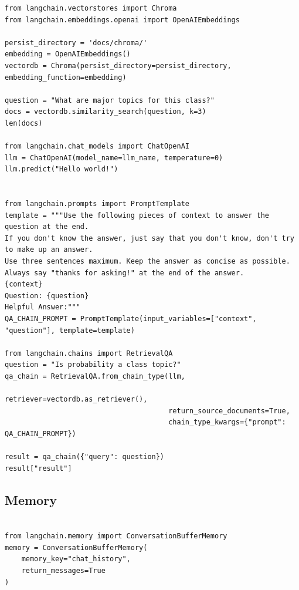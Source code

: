 \documentclass{article}
\begin{document}
\begin{lstlisting}[style=pythonstyle, caption={Custom Chat Model with LangChain}]
from langchain.vectorstores import Chroma
from langchain.embeddings.openai import OpenAIEmbeddings

persist_directory = 'docs/chroma/'
embedding = OpenAIEmbeddings()
vectordb = Chroma(persist_directory=persist_directory, embedding_function=embedding)

question = "What are major topics for this class?"
docs = vectordb.similarity_search(question, k=3)
len(docs)

from langchain.chat_models import ChatOpenAI
llm = ChatOpenAI(model_name=llm_name, temperature=0)
llm.predict("Hello world!")


from langchain.prompts import PromptTemplate
template = """Use the following pieces of context to answer the question at the end.
If you don't know the answer, just say that you don't know, don't try to make up an answer.
Use three sentences maximum. Keep the answer as concise as possible.
Always say "thanks for asking!" at the end of the answer.
{context}
Question: {question}
Helpful Answer:"""
QA_CHAIN_PROMPT = PromptTemplate(input_variables=["context", "question"], template=template)

from langchain.chains import RetrievalQA
question = "Is probability a class topic?"
qa_chain = RetrievalQA.from_chain_type(llm,
                                       retriever=vectordb.as_retriever(),
                                       return_source_documents=True,
                                       chain_type_kwargs={"prompt": QA_CHAIN_PROMPT})

result = qa_chain({"query": question})
result["result"]
\end{lstlisting}

\pagebreak

\subsection{Memory}

\begin{lstlisting}[style=pythonstyle, caption={Import and Define Memory}]

from langchain.memory import ConversationBufferMemory
memory = ConversationBufferMemory(
    memory_key="chat_history",
    return_messages=True
)

\end{lstlisting}

\bigskip
\end{document}
